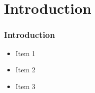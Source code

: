 \section{Introduction}
\begin{frame}
    \frametitle{Introduction}
    \begin{itemize}
        \item Item 1
        \item Item 2
        \item Item 3
    \end{itemize}
\end{frame}